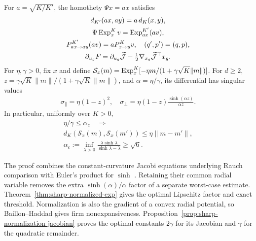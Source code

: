 \begin{proposition}
\label{prop:main-sharp-geometry}
For $a=\sqrt{K/K'}$, the homothety $\Psi x=ax$ satisfies
\begin{gather}
 d_{K'}(ax,ay)=a\,d_K(x,y),\\
 \Psi\operatorname{Exp}_x^Kv=\operatorname{Exp}_{ax}^{K'}(av),\\
 P_{ax\to ay}^{K'}(av)=aP_{x\to y}^Kv,\quad(q',p')=(q,p),\\
 \partial_{u_g}F=\partial_{u_g}\widetilde{\mathcal J}-\tfrac12\nabla_{x_g}\widetilde{\mathcal J}^{\top}x_g.
\end{gather}
For $\eta,\gamma>0$, fix $x$ and define $\mathcal S_x(m)=\operatorname{Exp}_x^K[-\eta m/(1+\gamma\sqrt K\|m\|)]$. For $d\ge2$, $z=\gamma\sqrt K\|m\|/(1+\gamma\sqrt K\|m\|)$, and $\alpha=\eta/\gamma$, its differential has singular values
\begin{gather}
 \sigma_\parallel=\eta(1-z)^2,\quad
 \sigma_\perp=\eta(1-z)\frac{\sinh(\alpha z)}{\alpha z}.
\end{gather}
In particular, uniformly over $K>0$,
\begin{gather}
 \eta/\gamma\le\alpha_c\quad\Longrightarrow\\[-4pt]
 d_K(\mathcal S_x(m),\mathcal S_x(m'))\le\eta\|m-m'\|,\\
 \alpha_c:=\inf_{\lambda>0}\frac{\lambda\sinh\lambda}{\sinh\lambda-\lambda}\ge\sqrt6.
\end{gather}
\end{proposition}
The proof combines the constant-curvature Jacobi equations underlying Rauch comparison \citep{lee2018riemannian} with Euler's product for $\sinh$ \citep{nistDLMF}. Retaining their common radial variable removes the extra $\sinh(\alpha)/\alpha$ factor of a separate worst-case estimate. Theorem~\ref{thm:sharp-normalized-exp} gives the optimal Lipschitz factor and exact threshold. Normalization is also the gradient of a convex radial potential, so Baillon--Haddad \citep{bauschke2010baillon} gives firm nonexpansiveness. Proposition~\ref{prop:sharp-normalization-jacobian} proves the optimal constants $2\gamma$ for its Jacobian and $\gamma$ for the quadratic remainder.

